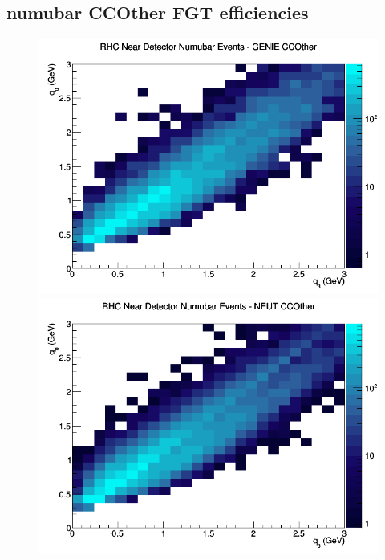\documentclass[12pt]{article}
\begin{document}
\subsection{numubar CCOther FGT efficiencies}
\begin{figure}[h]
\includegraphics[width=\linewidth]{eff_q0_q3/FGT/CCOther_RHC_ND_numubar_q3_q0_GENIE.png}
\endminipage
{}
\includegraphics[width=\linewidth]{eff_q0_q3/FGT/CCOther_RHC_ND_numubar_q3_q0_NEUT.png}
\endminipage
{}

\end{figure}
\end{document}
